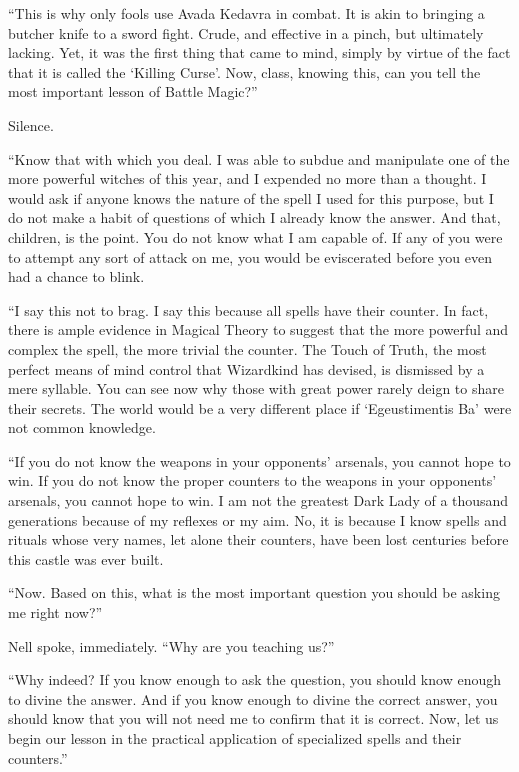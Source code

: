 “This is why only fools use Avada Kedavra in combat. It is akin to bringing a butcher knife to a sword fight. Crude, and effective in a pinch, but ultimately lacking. Yet, it was the first thing that came to mind, simply by virtue of the fact that it is called the ‘Killing Curse’. Now, class, knowing this, can you tell the most important lesson of Battle Magic?”

Silence.

“Know that with which you deal. I was able to subdue and manipulate one of the more powerful witches of this year, and I expended no more than a thought. I would ask if anyone knows the nature of the spell I used for this purpose, but I do not make a habit of questions of which I already know the answer. And that, children, is the point. You do not know what I am capable of. If any of you were to attempt any sort of attack on me, you would be eviscerated before you even had a chance to blink.

“I say this not to brag. I say this because all spells have their counter. In fact, there is ample evidence in Magical Theory to suggest that the more powerful and complex the spell, the more trivial the counter. The Touch of Truth, the most perfect means of mind control that Wizardkind has devised, is dismissed by a mere syllable. You can see now why those with great power rarely deign to share their secrets. The world would be a very different place if ‘Egeustimentis Ba’ were not common knowledge.

“If you do not know the weapons in your opponents’ arsenals, you cannot hope to win. If you do not know the proper counters to the weapons in your opponents’ arsenals, you cannot hope to win. I am not the greatest Dark Lady of a thousand generations because of my reflexes or my aim. No, it is because I know spells and rituals whose very names, let alone their counters, have been lost centuries before this castle was ever built.

“Now. Based on this, what is the most important question you should be asking me right now?”

Nell spoke, immediately. “Why are you teaching us?”

“Why indeed? If you know enough to ask the question, you should know enough to divine the answer. And if you know enough to divine the correct answer, you should know that you will not need me to confirm that it is correct. Now, let us begin our lesson in the practical application of specialized spells and their counters.”

